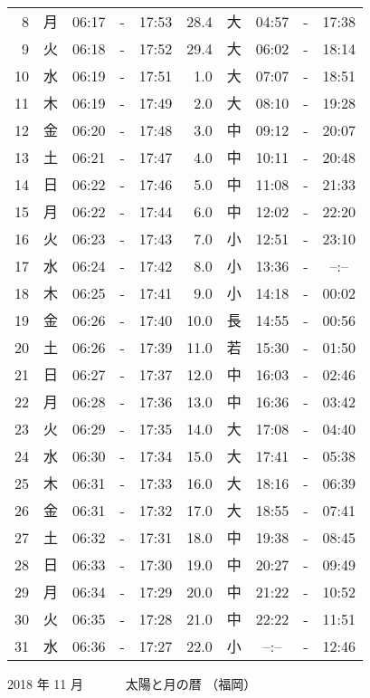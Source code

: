 \documentclass[a4j,10pt]{jsarticle}
\begin{document}
\begin{center}
\begin{table}[ht]
\begin{center}
\begin{tabular}{|rc|ccc|rc|ccc|}
  8 & 月 & 06:17 &-& 17:53 & 28.4 & 大 & 04:57 &-& 17:38 \\
  9 & 火 & 06:18 &-& 17:52 & 29.4 & 大 & 06:02 &-& 18:14 \\
 10 & 水 & 06:19 &-& 17:51 &  1.0 & 大 & 07:07 &-& 18:51 \\
 11 & 木 & 06:19 &-& 17:49 &  2.0 & 大 & 08:10 &-& 19:28 \\
 12 & 金 & 06:20 &-& 17:48 &  3.0 & 中 & 09:12 &-& 20:07 \\
 13 & 土 & 06:21 &-& 17:47 &  4.0 & 中 & 10:11 &-& 20:48 \\
 14 & 日 & 06:22 &-& 17:46 &  5.0 & 中 & 11:08 &-& 21:33 \\
 15 & 月 & 06:22 &-& 17:44 &  6.0 & 中 & 12:02 &-& 22:20 \\
 16 & 火 & 06:23 &-& 17:43 &  7.0 & 小 & 12:51 &-& 23:10 \\
 17 & 水 & 06:24 &-& 17:42 &  8.0 & 小 & 13:36 &-& --:-- \\
 18 & 木 & 06:25 &-& 17:41 &  9.0 & 小 & 14:18 &-& 00:02 \\
 19 & 金 & 06:26 &-& 17:40 & 10.0 & 長 & 14:55 &-& 00:56 \\
 20 & 土 & 06:26 &-& 17:39 & 11.0 & 若 & 15:30 &-& 01:50 \\
 21 & 日 & 06:27 &-& 17:37 & 12.0 & 中 & 16:03 &-& 02:46 \\
 22 & 月 & 06:28 &-& 17:36 & 13.0 & 中 & 16:36 &-& 03:42 \\
 23 & 火 & 06:29 &-& 17:35 & 14.0 & 大 & 17:08 &-& 04:40 \\
 24 & 水 & 06:30 &-& 17:34 & 15.0 & 大 & 17:41 &-& 05:38 \\
 25 & 木 & 06:31 &-& 17:33 & 16.0 & 大 & 18:16 &-& 06:39 \\
 26 & 金 & 06:31 &-& 17:32 & 17.0 & 大 & 18:55 &-& 07:41 \\
 27 & 土 & 06:32 &-& 17:31 & 18.0 & 中 & 19:38 &-& 08:45 \\
 28 & 日 & 06:33 &-& 17:30 & 19.0 & 中 & 20:27 &-& 09:49 \\
 29 & 月 & 06:34 &-& 17:29 & 20.0 & 中 & 21:22 &-& 10:52 \\
 30 & 火 & 06:35 &-& 17:28 & 21.0 & 中 & 22:22 &-& 11:51 \\
 31 & 水 & 06:36 &-& 17:27 & 22.0 & 小 & --:-- &-& 12:46 \\
\hline
\end{tabular}
\end{center}
\end{table}
\newpage
{\large 2018 年 11 月}
{\Large 　　　太陽と月の暦   （福岡） }

\end{center}
\end{document}
